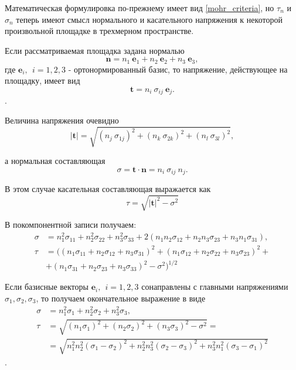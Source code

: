 Математическая формулировка по-прежнему имеет вид \ref{mohr_criteria}, но $\tau_n$ и $\sigma_n$ теперь имеют смысл нормального и касательного напряжения к некоторой произвольной площадке в трехмерном пространстве.

Если рассматриваемая площадка задана нормалью
\begin{equation}
\mathbf{n} = n_1~\mathbf{e}_1 + n_2~\mathbf{e}_2 + n_3~\mathbf{e}_3,
\end{equation}
где $\mathbf{e}_i,~~ i=1,2,3$ - ортонормированный базис, то напряжение, действующее на площадку, имеет вид
\begin{equation}
\mathbf{t} = n_i~\sigma_{ij}~\mathbf{e}_j.
\end{equation}.

Величина напряжения очевидно
\begin{equation}
|\mathbf{t}| = \sqrt{ (n_j~\sigma_{1j})^2 + (n_k~\sigma_{2k})^2 + (n_l~\sigma_{3l})^2},
\end{equation}

а нормальная составляющая
\begin{equation}
\sigma = \mathbf{t}\cdot\mathbf{n} = n_i~\sigma_{ij}~n_j.
\end{equation}

В этом случае касательная составляющая выражается как
\begin{equation}
\tau = \sqrt{|\mathbf{t}|^2 - \sigma^2}
\end{equation}

В покомпонентной записи получаем:
\begin{align}
\sigma &= n_1^2 \sigma_{11} + n_2^2 \sigma_{22} + n_3^2 \sigma_{33} + 
	2(n_1 n_2 \sigma_{12} + n_2 n_3 \sigma_{23} + n_3 n_1 \sigma_{31}), \nonumber\\
\tau &= ((n_1\sigma_{11} + n_2\sigma_{12} + n_3\sigma_{31})^2 +
	(n_1\sigma_{12} + n_2\sigma_{22} + n_3\sigma_{23})^2 + \nonumber\\
 &	+ (n_1\sigma_{31} + n_2\sigma_{23} + n_3\sigma_{33})^2 - \sigma^2)^{1/2}
\end{align}

Если базисные векторы $\mathbf{e}_i,~~ i=1,2,3$ сонаправлены с главными напряжениями $\sigma_1, \sigma_2, \sigma_3$, то получаем окончательное выражение в виде
\begin{align}
    \sigma &= n_1^2 \sigma_{1} + n_2^2 \sigma_{2} + n_3^2 \sigma_{3}, \nonumber\\
    \tau &= \sqrt{(n_1\sigma_{1})^2 + (n_2\sigma_{2})^2 + (n_3\sigma_{3})^2 - \sigma^2} = \nonumber\\
         &= \sqrt{n_1^2 n_2^2 (\sigma_1-\sigma_2)^2 + n_2^2 n_3^2 (\sigma_2-\sigma_3)^2 + 
                 n_3^2 n_1^2 (\sigma_3 - \sigma_1)^2}
\end{align}.


